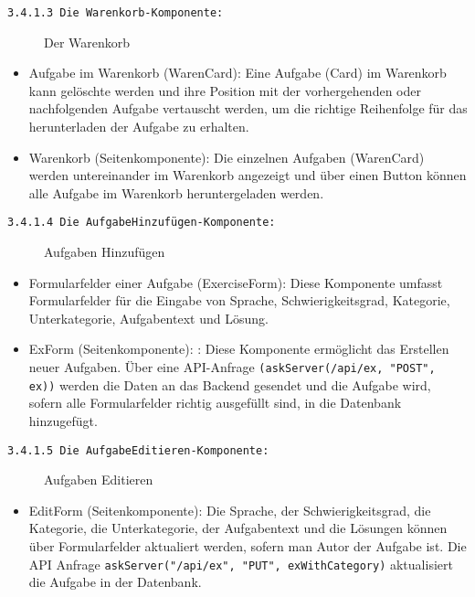 \texttt{3.4.1.3 Die Warenkorb-Komponente:}


\begin{figure}[H]
  \caption{Der Warenkorb \cite{fig:warenkorb}}
\end{figure}

\begin{itemize}

\item Aufgabe im Warenkorb (WarenCard):
Eine Aufgabe (Card) im Warenkorb kann gelöschte werden und ihre Position mit der vorhergehenden oder nachfolgenden Aufgabe vertauscht werden, um die richtige Reihenfolge für das herunterladen der Aufgabe zu erhalten. 


\item Warenkorb (Seitenkomponente):
Die einzelnen Aufgaben (WarenCard) werden untereinander im Warenkorb angezeigt und über einen Button können alle Aufgabe im Warenkorb heruntergeladen werden.


\end{itemize}

\texttt{3.4.1.4 Die AufgabeHinzufügen-Komponente:}
\begin{figure}[H]
  \caption{Aufgaben Hinzufügen \cite{fig:hinzufuegen}}
\end{figure}

\begin{itemize}

\item{Formularfelder einer Aufgabe (ExerciseForm)}:
Diese Komponente umfasst Formularfelder für die Eingabe von Sprache, Schwierigkeitsgrad, Kategorie, Unterkategorie, Aufgabentext und Lösung.

\item ExForm (Seitenkomponente): :
Diese Komponente ermöglicht das Erstellen neuer Aufgaben. Über eine API-Anfrage \texttt{(askServer(/api/ex, "POST", ex))} werden die Daten an das Backend gesendet und die Aufgabe wird, sofern alle Formularfelder richtig ausgefüllt sind, in die Datenbank hinzugefügt.


\end{itemize}

\texttt{3.4.1.5 Die AufgabeEditieren-Komponente:}
\begin{figure}[H]
  \caption{Aufgaben Editieren \cite{fig:editieren}}
\end{figure}

\begin{itemize}
\item{EditForm} (Seitenkomponente):
Die Sprache, der Schwierigkeitsgrad, die Kategorie, die Unterkategorie, der Aufgabentext und die Lösungen können über Formularfelder aktualiert werden, sofern man Autor der Aufgabe ist.
Die API Anfrage \texttt{askServer("/api/ex", "PUT", exWithCategory)} aktualisiert die Aufgabe in der Datenbank.


\end{itemize}
